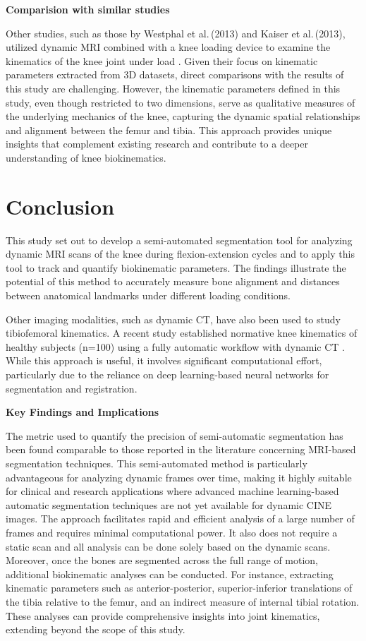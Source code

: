 \documentclass{micro-econ-thesis}
\begin{document}
\textbf{Comparision with similar studies }

Other studies, such as those by Westphal et al.\,(2013) and Kaiser et al.\,(2013), utilized dynamic MRI combined with a knee loading device to examine the kinematics of the knee joint under load \autocites{westphal_load-dependent_2013}{kaiser_measurement_2013}. Given their focus on kinematic parameters extracted from 3D datasets, direct comparisons with the results of this study are challenging. However, the kinematic parameters defined in this study, even though restricted to two dimensions, serve as qualitative measures of the underlying mechanics of the knee, capturing the dynamic spatial relationships and alignment between the femur and tibia. This approach provides unique insights that complement existing research and contribute to a deeper understanding of knee biokinematics.  

\section{Conclusion}
\label{sec:conclusion}
This study set out to develop a semi-automated segmentation tool for analyzing dynamic MRI scans of the knee during flexion-extension cycles and to apply this tool to track and quantify biokinematic parameters. The findings illustrate the potential of this method to accurately measure bone alignment and distances between anatomical landmarks under different loading conditions.

Other imaging modalities, such as dynamic CT, have also been used to study tibiofemoral kinematics. A recent study established normative knee kinematics of healthy subjects (n=100) using a fully automatic workflow with dynamic CT \parencite{dunning_fully_2023}. While this approach is useful, it involves significant computational effort, particularly due to the reliance on deep learning-based neural networks for segmentation and registration. 

\textbf{Key Findings and Implications}

The metric used to quantify the precision of semi-automatic segmentation has been found comparable to those reported in the literature concerning MRI-based segmentation techniques. This semi-automated method is particularly advantageous for analyzing dynamic frames over time, making it highly suitable for clinical and research applications where advanced machine learning-based automatic segmentation techniques are not yet available for dynamic CINE images. The approach facilitates rapid and efficient analysis of a large number of frames and requires minimal computational power. It also does not require a static scan and all analysis can be done solely based on the dynamic scans. Moreover, once the bones are segmented across the full range of motion, additional biokinematic analyses can be conducted. For instance, extracting kinematic parameters such as anterior-posterior, superior-inferior translations of the tibia relative to the femur, and an indirect measure of internal tibial rotation. These analyses can provide comprehensive insights into joint kinematics, extending beyond the scope of this study.
\end{document}
